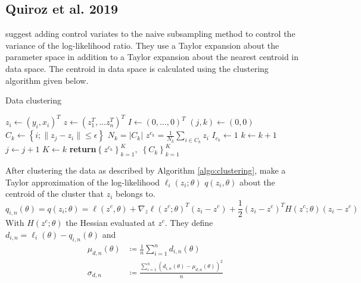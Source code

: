 \subsection{Quiroz et al. 2019}
\cite{quiroz2019speeding} suggest adding control variates to the naive subsampling method to control the variance of the log-likelihood ratio. They use a Taylor expansion about the parameter space in addition to a Taylor expansion about the nearest centroid in data space. The centroid in data space is calculated using the clustering algorithm given below. 
\begin{algorithm}
\caption{Data clustering}
\label{algo:clustering}
\begin{algorithmic}[1]
    \State $z_i \gets \left(y_i, x_i\right)^T$
    \State $z \gets \left(z_1^T, \ldots z_n^T\right)^T $
    \State $I \gets \left(0, \ldots, 0\right)^T$ 
    \State $\left(j,k\right) \gets \left(0,0\right)$
    \State $C_k \gets \left\{i; \lVert z_j - z_i \rVert \leq \epsilon\right\}  $
    \State $N_k = \left| C_k\right|$ 
    \State $z^{c_k} = \frac{1}{N_k} \sum_{i\in C_k} z_i$
    \State $I_{c_k} \gets 1$
    \State $k\gets k+1$
    \EndIf
    \State $j \gets j+1$
    \EndWhile
    \State $K\gets k$
    \State \textbf{return}$\left\{z^{c_k}\right\}_{k = 1}^K, \; \left\{C_k\right\}_{k=1}^K$
    \EndFunction
    \end{algorithmic}
\end{algorithm}{}
After clustering the data as described by Algorithm \ref{algo:clustering}, \cite{quiroz2019speeding} make a Taylor approximation of the log-likelihood $\ell_i\left(z_i;\theta\right)$ $q\left(z_i, \theta\right)$ about the centroid of the cluster that $z_i$ belongs to.  
\begin{equation}
    q_{i, n}\left(\theta\right) = q\left(z_i;\theta\right) = \ell\left(z^c, \theta\right) + \nabla_z \ell\left(z^c; \theta\right)^T \left(z_i - z^c \right) + \frac{1}{2}\left(z_i - z^c\right)^T H\left(z^c;\theta\right)\left(z_i - z^c\right)
\end{equation}
With $H\left(z^c; \theta\right)$ the Hessian evaluated at $z^c$. 
They define $d_{i, n} = \ell_i\left(\theta\right) - q_{i,n}\left(\theta\right)$ and 
\begin{equation*}
\begin{split}
    \mu_{d,n}\left(\theta\right) &\coloneqq \frac{1}{n}\sum_{i = 1}^n d_{i,n}\left(\theta\right) \\
    \sigma_{d,n} &\coloneqq \frac{\sum_{i=1}^n\left(d_{i,n}\left(\theta\right) - \mu_{d,n}\left(\theta\right)\right)^2}{n}
\end{split}
\end{equation*}{}
